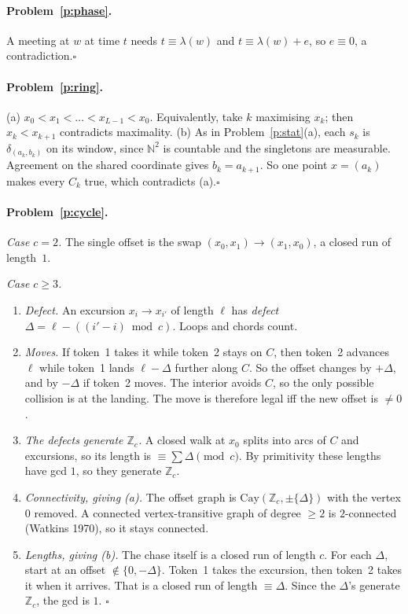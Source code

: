 \documentclass[11pt]{article}
\theoremstyle{definition}
\theoremstyle{remark}
\newcommand{\bbN}{\mathbb{N}}
\newcommand{\bbZ}{\mathbb{Z}}
\begin{document}
\paragraph{Problem~\ref{p:phase}.}
A meeting at $w$ at time $t$ needs $t\equiv\lambda(w)$ and
$t\equiv\lambda(w)+e$, so $e\equiv0$, a contradiction.\hfill$\square$

\paragraph{Problem~\ref{p:ring}.}
(a) $x_0<x_1<\dots<x_{L-1}<x_0$. Equivalently, take $k$ maximising $x_k$; then
$x_k<x_{k+1}$ contradicts maximality.
(b) As in Problem~\ref{p:stat}(a), each $s_k$ is $\delta_{(a_k,b_k)}$ on its
window, since $\bbN^2$ is countable and the singletons are measurable. Agreement
on the shared coordinate gives $b_k=a_{k+1}$. So one point $x=(a_k)$ makes every
$C_k$ true, which contradicts (a).\hfill$\square$

\paragraph{Problem~\ref{p:cycle}.}
\emph{Case $c=2$.} The single offset is the swap $(x_0,x_1)\to(x_1,x_0)$, a
closed run of length~$1$.

\emph{Case $c\ge3$.}
\begin{enumerate}[label=(\roman*)]
\item \emph{Defect.} An excursion $x_i\to x_{i'}$ of length $\ell$ has
  \emph{defect} $\Delta=\ell-((i'-i)\bmod c)$. Loops and chords count.
\item \emph{Moves.} If token~1 takes it while token~2 stays on $C$, then token~2
  advances $\ell$ while token~1 lands $\ell-\Delta$ further along $C$. So the
  offset changes by $+\Delta$, and by $-\Delta$ if token~2 moves. The interior
  avoids $C$, so the only possible collision is at the landing. The move is
  therefore legal iff the new offset is $\neq0$.
\item \emph{The defects generate $\bbZ_c$.} A closed walk at $x_0$ splits into
  arcs of $C$ and excursions, so its length is $\equiv\sum\Delta\pmod c$. By
  primitivity these lengths have gcd $1$, so they generate $\bbZ_c$.
\item \emph{Connectivity, giving (a).} The offset graph is
  $\mathrm{Cay}(\bbZ_c,\pm\{\Delta\})$ with the vertex $0$ removed. A connected
  vertex-transitive graph of degree $\ge2$ is $2$-connected (Watkins 1970), so it
  stays connected.
\item \emph{Lengths, giving (b).} The chase itself is a closed run of length $c$.
  For each $\Delta$, start at an offset $\notin\{0,-\Delta\}$. Token~1 takes the
  excursion, then token~2 takes it when it arrives. That is a closed run of length
  $\equiv\Delta$. Since the $\Delta$'s generate $\bbZ_c$, the gcd is $1$.
  \hfill$\square$
\end{enumerate}
\end{document}
